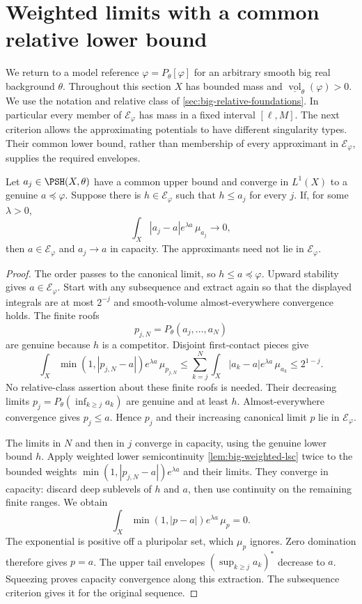 \section{Weighted limits with a common relative lower bound}
\label{sec:big-weighted-limits}

We return to a model reference $\varphi=P_\theta[\varphi]$ for an arbitrary smooth big real background $\theta$. Throughout this section $X$ has bounded mass and $\underline{\operatorname{vol}}_\theta(\varphi)>0$. We use the notation and relative class of \cref{sec:big-relative-foundations}. In particular every member of $\mathcal E_\varphi$ has mass in a fixed interval $[\ell,M]$. The next criterion allows the approximating potentials to have different singularity types. Their common lower bound, rather than membership of every approximant in $\mathcal E_\varphi$, supplies the required envelopes.

\begin{lemma}\label{lem:big-weighted-common-bound}
Let $a_j\in\PSH(X,\theta)$ have a common upper bound and converge in $L^1(X)$ to a genuine $a\preceq\varphi$. Suppose there is $h\in\mathcal E_\varphi$ such that $h\leq a_j$ for every $j$. If, for some $\lambda>0$,
\[
 \int_X|a_j-a|e^{\lambda a}\,\mu_{a_j}\longrightarrow0,
\]
then $a\in\mathcal E_\varphi$ and $a_j\to a$ in capacity. The approximants need not lie in $\mathcal E_\varphi$.
\end{lemma}
\begin{proof}
The order passes to the canonical limit, so $h\leq a\preceq\varphi$. Upward stability gives $a\in\mathcal E_\varphi$.
Start with any subsequence and extract again so that the displayed integrals are at most $2^{-j}$ and smooth-volume almost-everywhere convergence holds. The finite roofs
\[
 p_{j,N}=P_\theta(a_j,\ldots,a_N)
\]
are genuine because $h$ is a competitor. Disjoint first-contact pieces give
\[
 \int_X\min(1,|p_{j,N}-a|)e^{\lambda a}\,\mu_{p_{j,N}}
 \leq\sum_{k=j}^N\int_X|a_k-a|e^{\lambda a}\,\mu_{a_k}
 \leq2^{1-j}.
\]
No relative-class assertion about these finite roofs is needed. Their decreasing limits $p_j=P_\theta(\inf_{k\geq j}a_k)$ are genuine and at least $h$. Almost-everywhere convergence gives $p_j\leq a$. Hence $p_j$ and their increasing canonical limit $p$ lie in $\mathcal E_\varphi$.

The limits in $N$ and then in $j$ converge in capacity, using the genuine lower bound $h$. Apply weighted lower semicontinuity \cref{lem:big-weighted-lsc} twice to the bounded weights
$\min(1,|p_{j,N}-a|)e^{\lambda a}$ and their limits. They converge in capacity: discard deep sublevels of $h$ and $a$, then use continuity on the remaining finite ranges. We obtain
\[
 \int_X\min(1,|p-a|)e^{\lambda a}\,\mu_p=0.
\]
The exponential is positive off a pluripolar set, which $\mu_p$ ignores. Zero domination therefore gives $p=a$. The upper tail envelopes $(\sup_{k\geq j}a_k)^*$ decrease to $a$. Squeezing proves capacity convergence along this extraction. The subsequence criterion gives it for the original sequence.
\end{proof}


